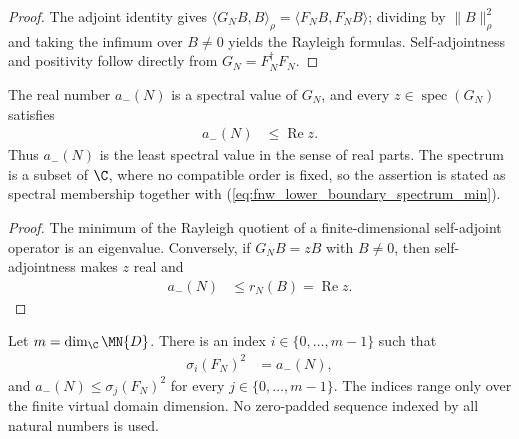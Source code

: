 \begin{proof}
    \leanok
    The adjoint identity gives
    $\langle G_NB,B\rangle_\rho=\langle F_NB,F_NB\rangle$; dividing by
    $\lVert B\rVert_\rho^2$ and taking the infimum over $B\neq0$ yields the
    Rayleigh formulas. Self-adjointness and positivity follow directly from
    $G_N=F_N^\dagger F_N$.
\end{proof}

\begin{lemma}
    \label{thm:fnw_lower_boundary_spectrum}
    \leanok
    The real number $a_-(N)$ is a spectral value of $G_N$, and every
    $z\in\operatorname{spec}(G_N)$ satisfies
    \begin{align}
        a_-(N) & \leq\operatorname{Re}z.
        \label{eq:fnw_lower_boundary_spectrum_min}
    \end{align}
    Thus $a_-(N)$ is the least spectral value in the sense of real parts.
    The spectrum is a subset of $\C$, where no compatible order is fixed, so
    the assertion is stated as spectral membership together with
    (\ref{eq:fnw_lower_boundary_spectrum_min}).
\end{lemma}

\begin{proof}
    \leanok
    The minimum of the Rayleigh quotient of a finite-dimensional self-adjoint
    operator is an eigenvalue. Conversely, if $G_NB=zB$ with $B\neq0$, then
    self-adjointness makes $z$ real and
    \begin{align}
        a_-(N)
         & \leq r_N(B)=\operatorname{Re}z.
    \end{align}
\end{proof}

\begin{lemma}
    \label{thm:fnw_lower_boundary_singular}
    \leanok
    Let $m=\dim_{\C}\MN{D}$. There is an index
    $i\in\{0,\ldots,m-1\}$ such that
    \begin{align}
        \sigma_i(F_N)^2 & =a_-(N),
        \label{eq:fnw_lower_boundary_least_singular}
    \end{align}
    and $a_-(N)\leq\sigma_j(F_N)^2$ for every
    $j\in\{0,\ldots,m-1\}$. The indices range only over the finite
    virtual domain dimension. No zero-padded sequence indexed by all natural
    numbers is used.
\end{lemma}

